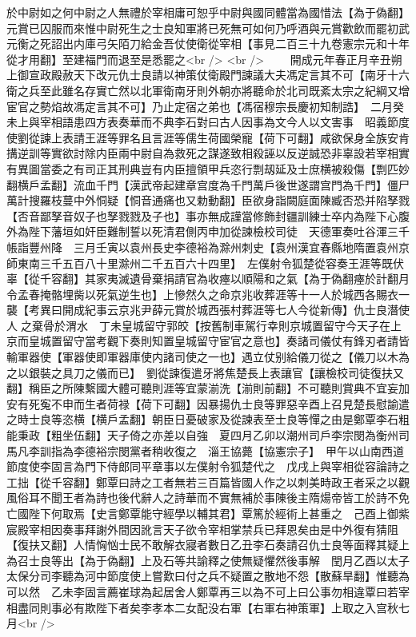 於中尉如之何中尉之人無禮於宰相庸可恕乎中尉與國同體當為國惜法【為于偽翻】元賞已囚服而來惟中尉死生之士良知軍將已死無可如何乃呼酒與元賞歡飲而罷初武元衡之死詔出内庫弓矢陌刀給金吾仗使衛從宰相【事見二百三十九卷憲宗元和十年從才用翻】至建福門而退至是悉罷之<br />
<br />
　　開成元年春正月辛丑朔上御宣政殿赦天下改元仇士良請以神策仗衛殿門諫議大夫馮定言其不可【南牙十六衛之兵至此雖名存實亡然以北軍衛南牙則外朝亦將聽命於北司既紊太宗之紀綱又增宦官之勢焰故馮定言其不可】乃止定宿之弟也【馮宿穆宗長慶初知制誥】　二月癸未上與宰相語患四方表奏華而不典李石對曰古人因事為文今人以文害事　昭義節度使劉從諫上表請王涯等罪名且言涯等儒生荷國榮寵【荷下可翻】咸欲保身全族安肯搆逆訓等實欲討除内臣兩中尉自為救死之謀遂致相殺誣以反逆誠恐非辜設若宰相實有異圖當委之有司正其刑典豈有内臣擅領甲兵恣行剽刼延及士庶横被殺傷【剽匹妙翻横戶孟翻】流血千門【漢武帝起建章宫度為千門萬戶後世遂謂宫門為千門】僵尸萬計搜羅枝蔓中外恫疑【恫音通痛也又勅動翻】臣欲身詣闕庭面陳臧否恐并陷孥戮【否音鄙孥音奴子也孥戮戮及子也】事亦無成謹當修飾封疆訓練士卒内為陛下心腹外為陛下藩垣如奸臣難制誓以死清君側丙申加從諫檢校司徒　天德軍奏吐谷渾三千帳詣豐州降　三月壬寅以袁州長史李德裕為滁州刺史【袁州漢宜春縣地隋置袁州京師東南三千五百八十里滁州二千五百六十四里】　左僕射令狐楚從容奏王涯等既伏辜【從千容翻】其家夷滅遺骨棄捐請官為收瘞以順陽和之氣【為于偽翻瘞於計翻月令孟春掩骼埋胔以死氣逆生也】上慘然久之命京兆收葬涯等十一人於城西各賜衣一襲【考異曰開成紀事云京兆尹薛元賞於城西張村葬涯等七人今從新傳】仇士良潛使人之棄骨於渭水　丁未皇城留守郭皎【按舊制車駕行幸則京城置留守今天子在上京而皇城置留守當考觀下奏則知置皇城留守宦官之意也】奏諸司儀仗有鋒刃者請皆輸軍器使【軍器使即軍器庫使内諸司使之一也】遇立仗别給儀刀從之【儀刀以木為之以銀裝之具刀之儀而已】　劉從諫復遣牙將焦楚長上表讓官【讓檢校司徒復扶又翻】稱臣之所陳繫國大體可聽則涯等宜蒙湔洗【湔則前翻】不可聽則賞典不宜妄加安有死寃不申而生者荷禄【荷下可翻】因暴揚仇士良等罪惡辛酉上召見楚長慰諭遣之時士良等恣横【横戶孟翻】朝臣日憂破家及從諫表至士良等憚之由是鄭覃李石粗能秉政【粗坐伍翻】天子倚之亦差以自強　夏四月乙卯以潮州司戶李宗閔為衡州司馬凡李訓指為李德裕宗閔黨者稍收復之　淄王協薨【協憲宗子】　甲午以山南西道節度使李固言為門下侍郎同平章事以左僕射令狐楚代之　戊戌上與宰相從容論詩之工拙【從千容翻】鄭覃曰詩之工者無若三百篇皆國人作之以刺美時政王者采之以觀風俗耳不聞王者為詩也後代辭人之詩華而不實無補於事陳後主隋煬帝皆工於詩不免亡國陛下何取焉【史言鄭覃能守經學以輔其君】覃篤於經術上甚重之　己酉上御紫宸殿宰相因奏事拜謝外間因訛言天子欲令宰相掌禁兵已拜恩矣由是中外復有猜阻【復扶又翻】人情恟忷士民不敢解衣寢者數日乙丑李石奏請召仇士良等面釋其疑上為召士良等出【為于偽翻】上及石等共諭釋之使無疑懼然後事解　閏月乙酉以太子太保分司李聽為河中節度使上嘗歎曰付之兵不疑置之散地不怨【散蘇旱翻】惟聽為可以然　乙未李固言薦崔球為起居舍人鄭覃再三以為不可上曰公事勿相違覃曰若宰相盡同則事必有欺陛下者矣李孝本二女配没右軍【右軍右神策軍】上取之入宫秋七月<br />
